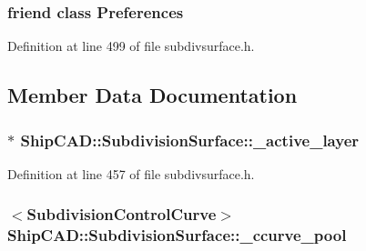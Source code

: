 \subsubsection[{\texorpdfstring{Preferences}{Preferences}}]{\setlength{\rightskip}{0pt plus 5cm}friend class {\bf Preferences}\hspace{0.3cm}{\ttfamily [friend]}}\hypertarget{classShipCAD_1_1SubdivisionSurface_aac5731b90dac5ab98f6153447ce63674}{}\label{classShipCAD_1_1SubdivisionSurface_aac5731b90dac5ab98f6153447ce63674}


Definition at line 499 of file subdivsurface.\+h.



\subsection{Member Data Documentation}
\subsubsection[{\texorpdfstring{\+\_\+active\+\_\+layer}{_active_layer}}]{$\ast$ Ship\+C\+A\+D\+::\+Subdivision\+Surface\+::\+\_\+active\+\_\+layer\hspace{0.3cm}{\ttfamily [protected]}}\hypertarget{classShipCAD_1_1SubdivisionSurface_aef766e0b62189247c0f3214c56800040}{}\label{classShipCAD_1_1SubdivisionSurface_aef766e0b62189247c0f3214c56800040}


Definition at line 457 of file subdivsurface.\+h.

\subsubsection[{\texorpdfstring{\+\_\+ccurve\+\_\+pool}{_ccurve_pool}}]{$<${\bf Subdivision\+Control\+Curve}$>$ Ship\+C\+A\+D\+::\+Subdivision\+Surface\+::\+\_\+ccurve\+\_\+pool\hspace{0.3cm}{\ttfamily [protected]}}\hypertarget{classShipCAD_1_1SubdivisionSurface_a5aea3b12c1d7f9903e2503f3b3cb4392}{}\label{classShipCAD_1_1SubdivisionSurface_a5aea3b12c1d7f9903e2503f3b3cb4392}


